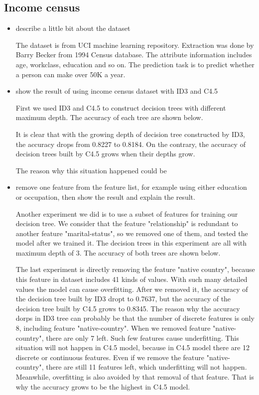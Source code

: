 \documentclass[a4paper]{article}
\begin{document}
\subsection{Income census}

\begin{itemize}
	\item describe a little bit about the dataset

    The dataset is from UCI machine learning repository. Extraction was done by Barry Becker from 1994 Census database. The attribute information includes age, workclass, education and so on. The prediction task is to predict whether a person can make over 50K a year.


	\item show the result of using income census dataset with ID3 and C4.5

	First we used ID3 and C4.5 to construct decision trees with different maximum depth. The accuracy of each tree are shown below.

	It is clear that with the growing depth of decision tree constructed by ID3, the accuracy drops from 0.8227 to 0.8184. On the contrary, the accuracy of decision trees built by C4.5 grows when their depths grow.

    The reason why this situation happened could be

	\item remove one feature from the feature list, for example using either education or occupation, then show the result and explain the result.

    Another experiment we did is to use a subset of features for training our decision tree. We consider that the feature "relationship" is redundant to another feature "marital-status", so we removed one of them, and tested the model after we trained it. The decision trees in this experiment are all with maximum depth of 3. The accuracy of both trees are shown below.

    The last experiment is directly removing the feature "native country", because this feature in dataset includes 41  kinds of values. With such many detailed values the model can cause overfitting. After we removed it, the accuracy of the decision tree built by ID3 dropt to 0.7637, but the accuracy of the decision tree built by C4.5 grows to 0.8345. The reason why the accuracy dorps in ID3 tree can probably be that the number of discrete features is only 8, including feature "native-country". When we removed feature "native-country", there are only 7 left. Such few features cause underfitting. This situation will not happen in C4.5 model, because in C4.5 model there are 12 discrete or continuous features. Even if we remove the feature "native-country", there are still 11 features left, which underfitting will not happen. Meanwhile, overfitting is also avoided by that removal of that feature. That is why the accuracy grows to be the highest in C4.5 model.

\end{itemize}



\end{document}

